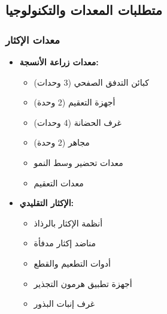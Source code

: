 \subsection{متطلبات المعدات والتكنولوجيا}

\subsubsection{معدات الإكثار}
\begin{itemize}
    \item \textbf{معدات زراعة الأنسجة:}
    \begin{itemize}
        \item كبائن التدفق الصفحي (3 وحدات)
        \item أجهزة التعقيم (2 وحدة)
        \item غرف الحضانة (4 وحدات)
        \item مجاهر (2 وحدة)
        \item معدات تحضير وسط النمو
        \item معدات التعقيم
    \end{itemize}
    
    \item \textbf{الإكثار التقليدي:}
    \begin{itemize}
        \item أنظمة الإكثار بالرذاذ
        \item مناضد إكثار مدفأة
        \item أدوات التطعيم والقطع
        \item أجهزة تطبيق هرمون التجذير
        \item غرف إنبات البذور
    \end{itemize}
\end{itemize}

